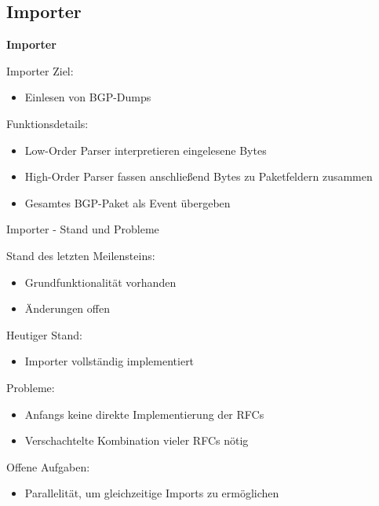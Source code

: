 \documentclass[9pt]{beamer}
\begin{document}
\subsection{Importer}

\begin{frame}{}
	\begin{center}
		\LARGE \textbf{Importer}
	\end{center}
\end{frame}

\begin{frame}{Importer}{}
   Ziel:
   	\begin{itemize}
   	\item Einlesen von BGP-Dumps
   	\end{itemize}
   	\vspace{0,3cm}
   Funktionsdetails:
	\begin{itemize}
		\item Low-Order Parser interpretieren eingelesene Bytes
		\item High-Order Parser fassen anschließend Bytes zu Paketfeldern zusammen
		\item Gesamtes BGP-Paket als Event übergeben
	\end{itemize}
\end{frame}

\begin{frame}{Importer - Stand und Probleme}{}

	Stand des letzten Meilensteins:
	\begin{itemize}
		\item Grundfunktionalität vorhanden
		\item Änderungen offen
	\end{itemize}
	\vspace{0,3cm}
	Heutiger Stand:
	\begin{itemize}
		\item Importer vollständig implementiert
	\end{itemize}
	\vspace{0,3cm}
	Probleme:
	\begin{itemize}
		\item Anfangs keine direkte Implementierung der RFCs
		\item Verschachtelte Kombination vieler RFCs nötig
	\end{itemize}
	\vspace{0,3cm}
	Offene Aufgaben:
	\begin{itemize}
		\item Parallelität, um gleichzeitige Imports zu ermöglichen
	\end{itemize}

\end{frame}
\end{document}
